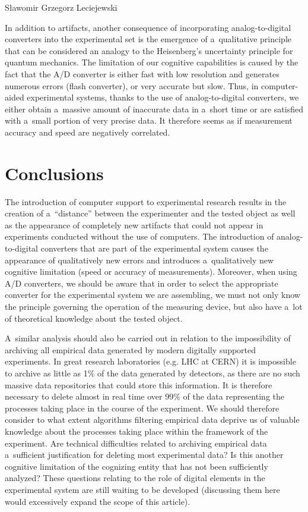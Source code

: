 \begin{artengenv}{Sławomir Grzegorz Leciejewski}
\enlargethispage{1.5\baselineskip}

In addition to artifacts, another consequence of incorporating analog-to-digital converters into the experimental set is the emergence of a~qualitative principle that can be considered an analogy to the Heisenberg's uncertainty principle for quantum mechanics. The limitation of our cognitive capabilities is caused by the fact that the A/D converter is either fast with low resolution and generates numerous errors (flash converter), or very accurate but slow. Thus, in computer-aided experimental systems, thanks to the use of analog-to-digital converters, we either obtain a~massive amount of inaccurate data in a~short time or are satisfied with a~small portion of very precise data. It therefore seems as if measurement accuracy and speed are negatively correlated.



\section*{Conclusions}

The introduction of computer support to experimental research results in the creation of a~``distance'' between the experimenter and the tested object as well as the appearance of completely new artifacts that could not appear in experiments conducted without the use of computers. The introduction of analog-to-digital converters that are part of the experimental system causes the appearance of qualitatively new errors and introduces a~qualitatively new cognitive limitation (speed or accuracy of measurements). Moreover, when using A/D converters, we should be aware that in order to select the appropriate converter for the experimental system we are assembling, we must not only know the principle governing the operation of the measuring device, but also have a~lot of theoretical knowledge about the tested object.



A~similar analysis should also be carried out in relation to the impossibility of archiving all empirical data generated by modern digitally supported experiments. In great research laboratories (e.g. LHC at CERN) it is impossible to archive as little as 1\% of the data generated by detectors, as there are no such massive data repositories that could store this information. It is therefore necessary to delete almost in real time over 99\% of the data representing the processes taking place in the course of the experiment. We should therefore consider to what extent algorithms filtering empirical data deprive us of valuable knowledge about the processes taking place within the framework of the experiment. Are technical difficulties related to archiving empirical data a~sufficient justification for deleting most experimental data? Is this another cognitive limitation of the cognizing entity that has not been sufficiently analyzed? These questions relating to the role of digital elements in the experimental system are still waiting to be developed (discussing them here would excessively expand the scope of this article).




\end{artengenv}
